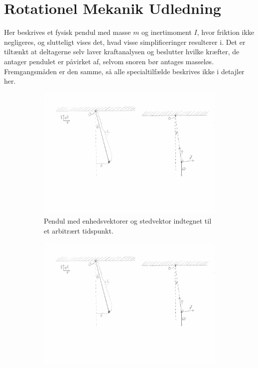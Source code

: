\chapter{Rotationel Mekanik Udledning}
Her beskrives et fysisk pendul med masse $m$ og inertimoment $I$, hvor friktion ikke negligeres, og slutteligt vises det, hvad visse simplificeringer resulterer i. Det er tiltænkt at deltagerne selv laver kraftanalysen og beslutter hvilke kræfter, de antager pendulet er påvirket af, selvom snoren bør antages masseløs. Fremgangsmåden er den samme, så alle specialtilfælde beskrives ikke i detajler her. \\

\begin{figure}[]
\centering
\begin{subfigure}{.5\textwidth}
  \centering
  \includegraphics[width=\linewidth]{RotationelMekanik/Pendul}
\caption{Pendul med enhedsvektorer og stedvektor indtegnet til et arbitrært tidspunkt.}
\label{fig:Pendul}
\end{subfigure}
\hspace{5mm}
\begin{subfigure}{.45\textwidth}
  \centering
  \includegraphics[width=\linewidth]{RotationelMekanik/Kraftanalyse}

\end{subfigure}
\end{figure}
